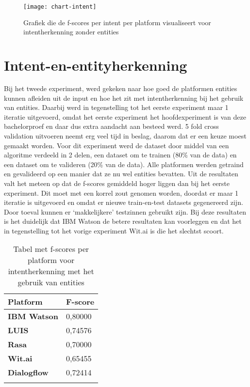 \begin{figure}[H]
    \label{fig:chart-intent-no-entity}
    \centering
    \texttt{[image: chart-intent]}
    \caption{Grafiek die de f-scores per intent per platform visualiseert voor intentherkenning zonder entities}
\end{figure}

\section{Intent-en-entityherkenning}

Bij het tweede experiment, werd gekeken naar hoe goed de platformen entities kunnen afleiden uit de input en hoe het zit met intentherkenning bij het gebruik van entities. Daarbij werd in tegenstelling tot het eerste experiment maar 1 iteratie uitgevoerd, omdat het eerste experiment het hoofdexperiment is van deze bachelorproef en daar dus extra aandacht aan besteed werd. 5 fold cross validation uitvoeren neemt erg veel tijd in beslag, daarom dat er een keuze moest gemaakt worden. Voor dit experiment werd de dataset door middel van een algoritme verdeeld in 2 delen, een dataset om te trainen (80\% van de data) en een dataset om te valideren (20\% van de data). Alle platformen werden getraind en gevalideerd op een manier dat ze nu wel entities bevatten. Uit de resultaten valt het meteen op dat de f-scores gemiddeld hoger liggen dan bij het eerste experiment. Dit moet met een korrel zout genomen worden, doordat er maar 1 iteratie is uitgevoerd en omdat er nieuwe train-en-test datasets gegenereerd zijn. Door toeval kunnen er ‘makkelijkere’ testzinnen gebruikt zijn. Bij deze resultaten is het duidelijk dat IBM Watson de betere resultaten kan voorleggen en dat het in tegenstelling tot het vorige experiment Wit.ai is die het slechtst scoort.


\begin{center}
    \begin{longtable}{| l | l |}
        \hline
        \textbf{Platform} & \textbf{F-score} \\ \hline
        \textbf{IBM Watson} & 0,80000 \\ \hline  
        \textbf{LUIS} & 0,74576 \\ \hline  
        \textbf{Rasa} & 0,70000 \\ \hline  
        \textbf{Wit.ai} & 0,65455  \\ \hline  
        \textbf{Dialogflow} & 0,72414 \\ \hline  
        \caption{Tabel met f-scores per platform voor intentherkenning met het gebruik van entities}                                    
    \end{longtable}
    \label{tbl:results-intent-entity}
\end{center}

